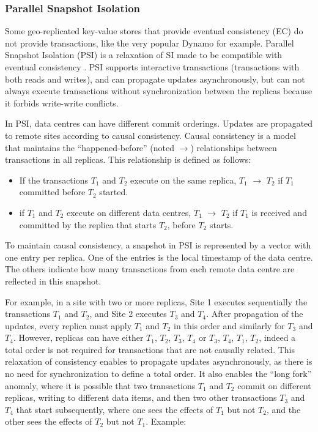 \documentclass[11pt]{article}
\newcommand\bulletitem{\item[$\bullet$]}
\begin{document}
\subsubsection{Parallel Snapshot Isolation}

Some geo-replicated key-value stores that provide eventual consistency (EC) do
not provide transactions, like the very popular Dynamo \cite{Dynamo2007} for
example. Parallel Snapshot Isolation (PSI) is a relaxation of SI made to be
compatible with eventual consistency \cite{Sovran2011}. PSI supports
interactive transactions (transactions with both reads and writes), and can
propagate updates asynchronously, but can not always execute transactions
without synchronization between the replicas because it forbids write-write
conflicts.

In PSI, data centres can have different commit orderings. Updates are
propagated to remote sites according to causal consistency. Causal consistency is
a model that maintains the ``happened-before'' (noted $\rightarrow$)
relationships between transactions in all replicas. This relationship is
defined as follows:

\begin{itemize}
	\bulletitem If the transactions $T_1$ and $T_2$ execute on the same
	replica, $T_1$ $\rightarrow$ $T_2$ if $T_1$ committed before $T_2$
	started.
	\bulletitem if $T_1$ and $T_2$ execute on different data centres, $T_1$
	$\rightarrow$ $T_2$ if $T_1$ is received and committed by the replica that
	starts $T_2$, before $T_2$ starts.
\end{itemize}

To maintain causal consistency, a snapshot in PSI is represented by a vector
with one entry per replica. One of the entries is the local timestamp of the
data centre. The others indicate how many transactions from each remote data
centre are reflected in this snapshot.

For example, in a site with two or more replicas, Site 1 executes sequentially
the transactions $T_1$ and $T_2$, and Site 2 executes $T_3$ and $T_4$. After
propagation of the updates, every replica must apply $T_1$ and $T_2$ in this
order and similarly for $T_3$ and $T_4$. However, replicas can have either
$T_1$, $T_2$, $T_3$, $T_4$ or $T_3$, $T_4$, $T_1$, $T_2$, indeed a total order
is not required for transactions that are not causally related. This
relaxation of consistency enables to propagate updates asynchronously, as
there is no need for synchronization to define a total order. It also enables
the ``long fork'' anomaly, where it is possible that two transactions $T_1$
and $T_2$ commit on different replicas, writing to different data items,
and then two other transactions $T_3$ and $T_4$ that start subsequently,
where one sees the effects of $T_1$ but not $T_2$, and the other sees the
effects of $T_2$ but not $T_1$. Example:
\end{document}
